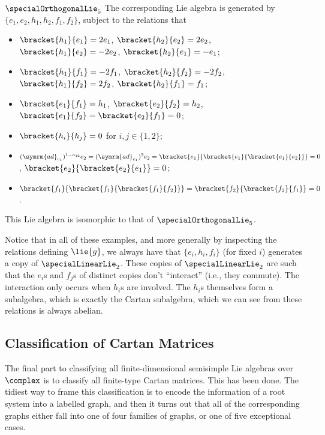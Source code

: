 \documentclass[fleqn]{NotesClass}
\newcommand{\ad}{\symrm{ad}}
\begin{document}
\begin{exm}{\(\specialOrthogonalLie_5\)}{}
        The corresponding Lie algebra is generated by \(\{e_1, e_2, h_1, h_2, f_1, f_2\}\), subject to the relations that
        \begin{itemize}
            \item \(\bracket{h_1}{e_1} = 2e_1\), \(\bracket{h_2}{e_2} = 2e_2\), \(\bracket{h_1}{e_2} = -2e_2\), \(\bracket{h_2}{e_1} = -e_1\);
            \item \(\bracket{h_1}{f_1} = -2f_1\), \(\bracket{h_2}{f_2} = -2f_2\), \(\bracket{h_1}{f_2} = 2f_2\), \(\bracket{h_2}{f_1} = f_1\);
            \item \(\bracket{e_1}{f_1} = h_1\), \(\bracket{e_2}{f_2} = h_2\), \(\bracket{e_1}{f_2} = \bracket{e_2}{f_1} = 0\);
            \item \(\bracket{h_i}{h_j} = 0\) for \(i, j \in \{1, 2\}\);
            \item \((\ad_{e_1})^{1 - a_{12}}e_2 = (\ad_{e_1})^3e_2 = \bracket{e_1}{\bracket{e_1}{\bracket{e_1}{e_2}}} = 0\), \(\bracket{e_2}{\bracket{e_2}{e_1}} = 0\);
            \item \(\bracket{f_1}{\bracket{f_1}{\bracket{f_1}{f_2}}} = \bracket{f_2}{\bracket{f_2}{f_1}} = 0\).
        \end{itemize}
        This Lie algebra is isomorphic to that of \(\specialOrthogonalLie_5\).
    \end{exm}
    
    Notice that in all of these examples, and more generally by inspecting the relations defining \(\lie{g}\), we always have that \(\{e_i, h_i, f_i\}\) (for fixed \(i\)) generates a copy of \(\specialLinearLie_2\).
    These copies of \(\specialLinearLie_2\) are such that the \(e_i\)s and \(f_j\)s of distinct copies don't \enquote{interact} (i.e., they commute).
    The interaction only occurs when \(h_i\)s are involved.
    The \(h_i\)s themselves form a subalgebra, which is exactly the Cartan subalgebra, which we can see from these relations is always abelian.
    
    \subsection{Classification of Cartan Matrices}
    The final part to classifying all finite-dimensional semisimple Lie algebras over \(\complex\) is to classify all finite-type Cartan matrices.
    This has been done.
    The tidiest way to frame this classification is to encode the information of a root system into a labelled graph, and then it turns out that all of the corresponding graphs either fall into one of four families of graphs, or one of five exceptional cases.
    
\end{document}
